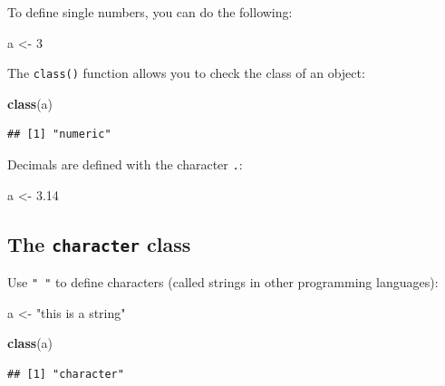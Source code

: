 \documentclass[]{gitbook}
\newenvironment{Shaded}{\begin{snugshade}}{\end{snugshade}}
\newcommand{\DecValTok}[1]{\textcolor[rgb]{0.00,0.00,0.81}{#1}}
\newcommand{\FloatTok}[1]{\textcolor[rgb]{0.00,0.00,0.81}{#1}}
\newcommand{\KeywordTok}[1]{\textcolor[rgb]{0.13,0.29,0.53}{\textbf{#1}}}
\newcommand{\NormalTok}[1]{#1}
\newcommand{\StringTok}[1]{\textcolor[rgb]{0.31,0.60,0.02}{#1}}
\theoremstyle{definition}
\theoremstyle{definition}
\theoremstyle{definition}
\theoremstyle{remark}
\begin{document}
To define single numbers, you can do the following:

\begin{Shaded}
\begin{Highlighting}[]
\NormalTok{a <-}\StringTok{ }\DecValTok{3}
\end{Highlighting}
\end{Shaded}

The \texttt{class()} function allows you to check the class of an
object:

\begin{Shaded}
\begin{Highlighting}[]
\KeywordTok{class}\NormalTok{(a)}
\end{Highlighting}
\end{Shaded}

\begin{verbatim}
## [1] "numeric"
\end{verbatim}

Decimals are defined with the character \texttt{.}:

\begin{Shaded}
\begin{Highlighting}[]
\NormalTok{a <-}\StringTok{ }\FloatTok{3.14}
\end{Highlighting}
\end{Shaded}

\hypertarget{the-character-class}{%
\subsection{\texorpdfstring{The \texttt{character}
class}{The character class}}\label{the-character-class}}

Use \texttt{"\ "} to define characters (called strings in other
programming languages):

\begin{Shaded}
\begin{Highlighting}[]
\NormalTok{a <-}\StringTok{ "this is a string"}
\end{Highlighting}
\end{Shaded}

\begin{Shaded}
\begin{Highlighting}[]
\KeywordTok{class}\NormalTok{(a)}
\end{Highlighting}
\end{Shaded}

\begin{verbatim}
## [1] "character"
\end{verbatim}
\end{document}
